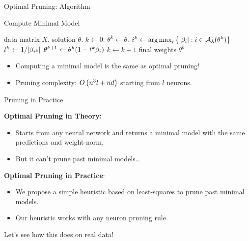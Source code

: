 \documentclass[usenames,dvipsnames,mathserif,notheorems]{beamer}
\newcommand{\bad}[1]{\textcolor{bad}{#1}}
\newcommand{\good}[1]{\textcolor{good}{#1}}
\begin{document}
\begin{frame}{Optimal Pruning: Algorithm}
	\begin{algorithm}[H]
		\caption{Compute Minimal Model}
		\begin{algorithmic}
			 data matrix \( X \), solution \( \theta \).
			\STATE \( k \gets 0 \).
			\STATE \( \theta^k \gets \theta \).
			\WHILE {\( \exists \beta \neq 0 \) s.t. \( \good{\sum_{\bi \in \act(\theta^k)} \beta_\bi D_i X \theta_i^k = 0} \)}
			\STATE \( {i}^k \gets \mathop{\rm arg\,max}_{{i}} \left\{|\beta_{i}| : {i} \in {\mathcal{A}_{\lambda}}(\theta^k)\right\}  \)
			\STATE \( t^k \gets 1/|\beta_{{i}^k}| \)
			\STATE \( \theta^{k+1} \gets \theta^k (1 - t^k \beta_{i}) \)
			\STATE \( k \gets k + 1 \)
			\ENDWHILE
			 final weights \( \theta^k \)
		\end{algorithmic}
	\end{algorithm}

	\pause
	\begin{itemize}
		\item Computing a \bad{minimal model} is the same as \good{optimal pruning}!
		      \pause
		\item Pruning complexity: \( O\left(n^3 l + nd\right) \) starting from \( l \) neurons.
	\end{itemize}

\end{frame}

\begin{frame}{Pruning in Practice}

	\textbf{Optimal Pruning in Theory:}
	\begin{itemize}
		\item Starts from any neural network and returns a minimal model
		      with the same \good{predictions} and \good{weight-norm}.
		      \pause

		\item But it can't prune past \bad{minimal models}\ldots
	\end{itemize}

	\vspace{2em}
	\pause

	\textbf{Optimal Pruning in Practice}:
	\begin{itemize}
		\item We propose a \good{simple heuristic} based on least-squares to prune
		      past minimal models.

		\item Our heuristic works with \good{any neuron pruning rule}.
	\end{itemize}

	\vspace{1em}
	\pause

	\begin{center}
		\Large
		Let's see how this does on real data!
	\end{center}

\end{frame}
\end{document}
